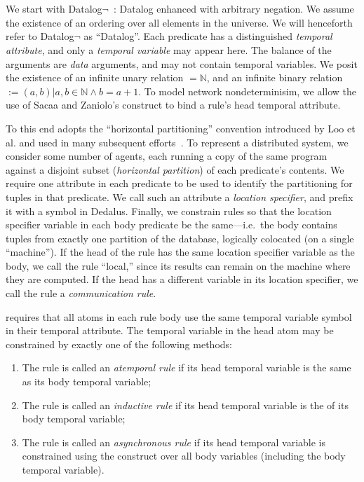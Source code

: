 \section{\large \bf \lang}
\label{sec:slang}

We start with Datalog$\lnot$~\cite{ullmanbook}: Datalog enhanced with arbitrary negation.  We assume the existence of an ordering \dedalus{<} over all elements in the universe.  We will henceforth refer to Datalog$\lnot$ as ``Datalog''.  Each predicate has a distinguished {\em temporal attribute}, and only a {\em temporal variable} may appear here.  The balance of the arguments are {\em data} arguments, and may not contain temporal variables.  We posit the existence of an infinite unary relation  $= \mathbb{N}$, and an infinite binary relation  $:= {(a,b) | a,b \in \mathbb{N} \land b = a + 1}$.  To model network nondeterminisim, we allow the use of Sacaa and Zaniolo's  construct to bind a rule's head temporal attribute.

 To this end \lang adopts the ``horizontal partitioning'' convention introduced by Loo et al. and used in many subsequent efforts~\cite{Loo:2005}. To represent a distributed system, we consider some number of agents, each running a copy of the same program against a disjoint subset ({\em horizontal partition}) of each predicate's contents.  We require one attribute in each predicate to be used to identify the partitioning for tuples in that predicate. We call such an attribute a {\em location specifier}, and prefix it with a \dedalus{\#} symbol in Dedalus.
Finally, we constrain \lang rules so that the location specifier variable in each body predicate be the same---i.e.\ the body contains tuples from exactly one partition of the database, logically colocated (on a single ``machine'').  If the head of the rule has the same location specifier variable as the body, we call the rule ``local,'' since its results can remain on the machine where they are computed.  If the head has a different variable in its location specifier, we call the rule a {\em communication rule}.

\lang requires that all atoms in each rule body use the same temporal variable symbol in their temporal attribute.  The temporal variable in the head atom may be constrained by exactly one of the following methods:

\begin{enumerate}
\item The rule is called an {\em atemporal rule} if its head temporal variable is the same as its body temporal variable;
\item The rule is called an {\em inductive rule} if its head temporal variable is the  of its body temporal variable;
\item The rule is called an {\em asynchronous rule} if its head temporal variable is constrained using the  construct over all body variables (including the body temporal variable).
\end{enumerate}

